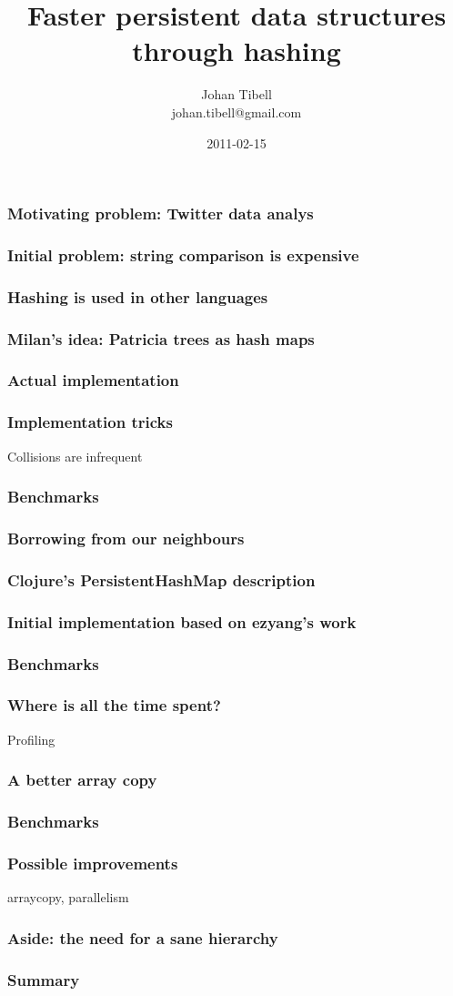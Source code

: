 \documentclass{beamer}
\title{Faster persistent data structures through hashing}
\author{Johan Tibell\\johan.tibell@gmail.com}
\date{2011-02-15}
\begin{document}
\lstset{language=Haskell}

\frame{\titlepage}

\begin{frame}
  \frametitle{Motivating problem: Twitter data analys}
\end{frame}

\begin{frame}
  \frametitle{Initial problem: string comparison is expensive}
\end{frame}

\begin{frame}
  \frametitle{Hashing is used in other languages}
\end{frame}

\begin{frame}
  \frametitle{Milan's idea: Patricia trees as hash maps}
\end{frame}

\begin{frame}
  \frametitle{Actual implementation}
\end{frame}

\begin{frame}
  \frametitle{Implementation tricks}
  Collisions are infrequent
\end{frame}

\begin{frame}
  \frametitle{Benchmarks}
\end{frame}

\begin{frame}
  \frametitle{Borrowing from our neighbours}
\end{frame}

\begin{frame}
  \frametitle{Clojure's PersistentHashMap description}
\end{frame}

\begin{frame}
  \frametitle{Initial implementation based on ezyang's work}
\end{frame}

\begin{frame}
  \frametitle{Benchmarks}
\end{frame}

\begin{frame}
  \frametitle{Where is all the time spent?}
  Profiling
\end{frame}

\begin{frame}
  \frametitle{A better array copy}
\end{frame}

\begin{frame}
  \frametitle{Benchmarks}
\end{frame}

\begin{frame}
  \frametitle{Possible improvements}
  arraycopy, parallelism
\end{frame}

\begin{frame}
  \frametitle{Aside: the need for a sane hierarchy}
\end{frame}

\begin{frame}
  \frametitle{Summary}
\end{frame}
\end{document}
